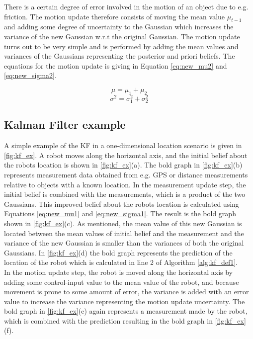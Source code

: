 There is a certain degree of error involved in the motion of an object due to e.g. friction. The motion update therefore consists of moving the mean value $\mu_{t-1}$ and adding some degree of uncertainty to the Gaussian which increases the variance of the new Gaussian w.r.t the original Gaussian. The motion update turns out to be very simple and is performed by adding the mean values and variances of the Gaussians representing the posterior and priori beliefs. The equations for the motion update is giving in Equation \ref{eq:new_mu2} and \ref{eq:new_sigma2}.

\begin{equation}
\label{eq:new_mu2}
\mu = \mu_{1} + \mu_{2}
\end{equation}
\begin{equation}
\label{eq:new_sigma2}
\sigma^2 = \sigma_{1}^2 + \sigma_{2}^2
\end{equation}

\subsection{Kalman Filter example}

A simple example of the KF in a one-dimensional location scenario is given in \autoref{fig:kf_ex}. A robot moves along the horizontal axis, and the initial belief about the robots location is shown in \autoref{fig:kf_ex}(a). The bold graph in \autoref{fig:kf_ex}(b) represents measurement data obtained from e.g. GPS or distance measurements relative to objects with a known location. In the measurement update step, the initial belief is combined with the measurements, which is a product of the two Gaussians. This improved belief about the robots location is calculated using Equations \ref{eq:new_mu1} and \ref{eq:new_sigma1}. The result is the bold graph shown in \autoref{fig:kf_ex}(c). As mentioned, the mean value of this new Gaussian is located between the mean values of initial belief and the measurement and the variance of the new Gaussian is smaller than the variances of both the original Gaussians. In \autoref{fig:kf_ex}(d) the bold graph represents the prediction of the location of the robot which is calculated in line 2 of Algorithm \ref{alg:kf_def1}. \\

In the motion update step, the robot is moved along the horizontal axis by adding some control-input value to the mean value of the robot, and because movement is prone to some amount of error, the variance is added with an error value to increase the variance representing the motion update uncertainty. The bold graph in \autoref{fig:kf_ex}(e) again represents a measurement made by the robot, which is combined with the prediction resulting in the bold graph in \autoref{fig:kf_ex}(f).

